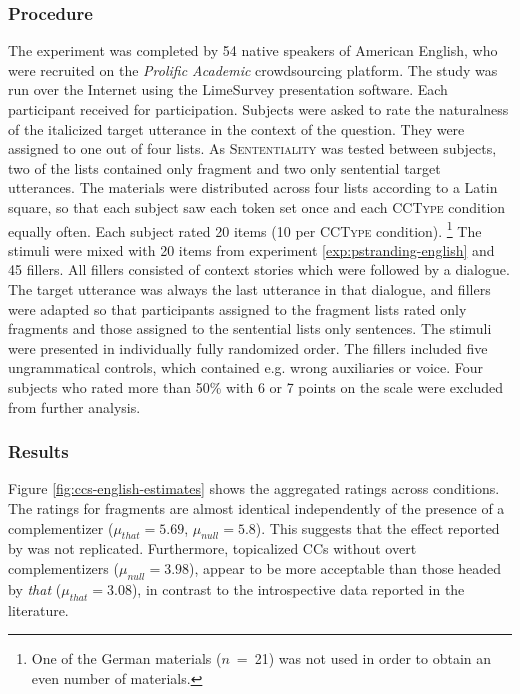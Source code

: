 \subsubsection{Procedure}\label{sec:ccs-english-method}
The experiment was completed by 54 native speakers of American English, who were recruited on the \textit{Prolific Academic} crowdsourcing platform. The study was run over the Internet using the LimeSurvey presentation software. Each participant received  for participation. Subjects were asked to rate the naturalness of the italicized target utterance in the context of the question. They were assigned to one out of four lists. As \textsc{Sententiality} was tested between subjects, two of the lists contained only fragment and two only sentential target utterances. The materials were distributed across four lists according to a Latin square, so that each subject saw each token set once and each \textsc{CCType} condition equally often. 
Each subject rated 20 items (10 per \textsc{CCType} condition).%
%
\footnote{One of the German materials ($n$~=~21) was not used in order to obtain an even number of materials.}\afterfn%
%
The stimuli were mixed with 20 items from experiment \ref{exp:pstranding-english} and 45 fillers. All fillers consisted of context stories which were followed by a dialogue. The target utterance was always the last utterance in that dialogue, and fillers were adapted so that participants assigned to the fragment lists rated only fragments and those assigned to the sentential lists only sentences. The stimuli were presented in individually fully randomized order. The fillers included five ungrammatical controls, which contained e.g. wrong auxiliaries or voice. Four subjects who rated more than 50\% with 6 or 7 points on the scale were excluded from further analysis.

\subsubsection{Results}\label{sec:ccs-english-results}

Figure \ref{fig:ccs-english-estimates} shows the aggregated ratings across conditions. The ratings for fragments are almost identical independently of the presence of a complementizer ($\mu_{that} = 5.69$, $\mu_{null} = 5.8$). This suggests that the effect reported by \citet{merchant.etal2013} was not replicated. Furthermore, topicalized CCs without overt complementizers ($\mu_{null} = 3.98$), appear to be more acceptable than those headed by \textit{that} ($\mu_{that} = 3.08$), in contrast to the introspective data reported in the literature.

